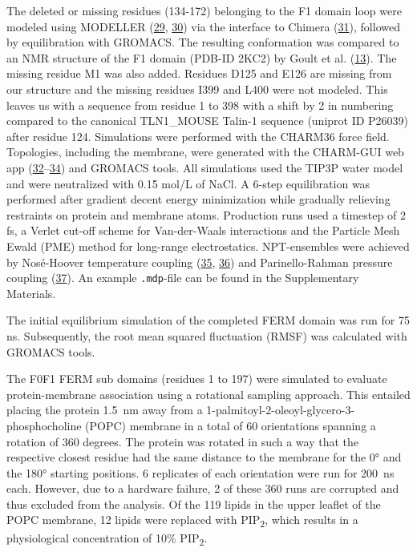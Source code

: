 \documentclass[
  twocolumn]{biophys-new-mod}
\begin{document}
The deleted or missing residues (134-172) belonging to the F1 domain
loop were modeled using MODELLER
(\protect\hyperlink{ref-marti-renomComparativeProteinStructure2000}{29},
\protect\hyperlink{ref-webbComparativeProteinStructure2016}{30}) via the
interface to Chimera
(\protect\hyperlink{ref-pettersenUCSFChimeraVisualization2004}{31}),
followed by equilibration with GROMACS. The resulting conformation was
compared to an NMR structure of the F1 domain (PDB-ID 2KC2) by Goult et
al. (\protect\hyperlink{ref-goultStructureDoubleUbiquitinlike2010}{13}).
The missing residue M1 was also added. Residues D125 and E126 are
missing from our structure and the missing residues I399 and L400 were
not modeled. This leaves us with a sequence from residue 1 to 398 with a
shift by 2 in numbering compared to the canonical TLN1\_MOUSE Talin-1
sequence (uniprot ID P26039) after residue 124. Simulations were
performed with the CHARM36 force field. Topologies, including the
membrane, were generated with the CHARM-GUI web app
(\protect\hyperlink{ref-brooksCHARMMBiomolecularSimulation2009}{32}--\protect\hyperlink{ref-leeCHARMMGUIInputGenerator2016}{34})
and GROMACS tools. All simulations used the TIP3P water model and were
neutralized with 0.15 mol/L of NaCl. A 6-step equilibration was
performed after gradient decent energy minimization while gradually
relieving restraints on protein and membrane atoms. Production runs used
a timestep of 2 fs, a Verlet cut-off scheme for Van-der-Waals
interactions and the Particle Mesh Ewald (PME) method for long-range
electrostatics. NPT-ensembles were achieved by Nosé-Hoover temperature
coupling
(\protect\hyperlink{ref-hooverCanonicalDynamicsEquilibrium1985}{35},
\protect\hyperlink{ref-noseUnifiedFormulationConstant1984}{36}) and
Parinello-Rahman pressure coupling
(\protect\hyperlink{ref-parrinelloPolymorphicTransitionsSingle1981}{37}).
An example \texttt{.mdp}-file can be found in the Supplementary
Materials.

The initial equilibrium simulation of the completed FERM domain was run
for 75 ns. Subsequently, the root mean squared fluctuation (RMSF) was
calculated with GROMACS tools.

The F0F1 FERM sub domains (residues 1 to 197) were simulated to evaluate
protein-membrane association using a rotational sampling approach. This
entailed placing the protein 1.5~nm away from a
1-palmitoyl-2-oleoyl-glycero-3-phosphocholine (POPC) membrane in a total
of 60 orientations spanning a rotation of 360 degrees. The protein was
rotated in such a way that the respective closest residue had the same
distance to the membrane for the 0° and the 180° starting positions. 6
replicates of each orientation were run for 200~ns each. However, due to
a hardware failure, 2 of these 360 runs are corrupted and thus excluded
from the analysis. Of the 119 lipids in the upper leaflet of the POPC
membrane, 12 lipids were replaced with PIP\textsubscript{2}, which
results in a physiological concentration of 10\% PIP\textsubscript{2}.
\end{document}
